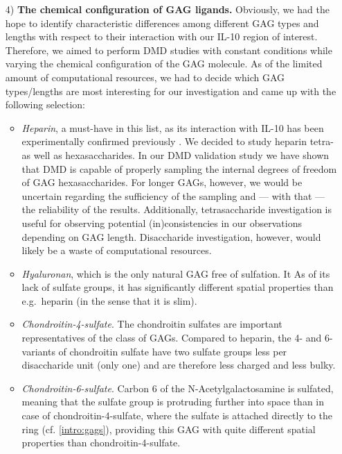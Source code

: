 \begin{itemize}
\item[4)] \textbf{The chemical configuration of GAG ligands.} Obviously, we had
the hope to identify characteristic differences among different GAG types and
lengths with respect to their interaction with our IL-10 region of interest.
Therefore, we aimed to perform DMD studies with constant conditions while
varying the chemical configuration of the GAG molecule. As of the limited amount
of computational resources, we had to decide which GAG types/lengths are most
interesting for our investigation and came up with the following selection:

\begin{itemize}

\item \textit{Heparin}, a must-have in this list, as its interaction with IL-10
has been experimentally confirmed previously \cite{salek_ardakani_2000}. We
decided to study heparin tetra- as well as hexasaccharides. In our DMD
validation study we have shown that DMD is capable of properly sampling the
internal degrees of freedom of GAG hexasaccharides. For longer GAGs, however, we
would be uncertain regarding the sufficiency of the sampling and --- with that
--- the reliability of the results. Additionally, tetrasaccharide investigation
is useful for observing potential (in)consistencies in our observations
depending on GAG length. Disaccharide investigation, however, would likely be a
waste of computational resources.

\item \textit{Hyaluronan}, which is the only natural GAG free of sulfation. It
As of its lack of sulfate groups, it has significantly different spatial
properties than e.g.\ heparin (in the sense that it is slim).

\item \textit{Chondroitin-4-sulfate}. The chondroitin sulfates are important
representatives of the class of GAGs. Compared to heparin, the 4- and 6-
variants of chondroitin sulfate have two sulfate groups less per disaccharide
unit (only one) and are therefore less charged and less bulky.

\item \textit{Chondroitin-6-sulfate}. Carbon 6 of the
N-Acetyl\-ga\-lacto\-sa\-mine is sulfated, meaning that the sulfate group is
protruding further into space than in case of chondroitin-4-sulfate, where the
sulfate is attached directly to the ring (cf. \cref{intro:gags}), providing this
GAG with quite different spatial properties than chondroitin-4-sulfate.

\end{itemize}

\end{itemize}


